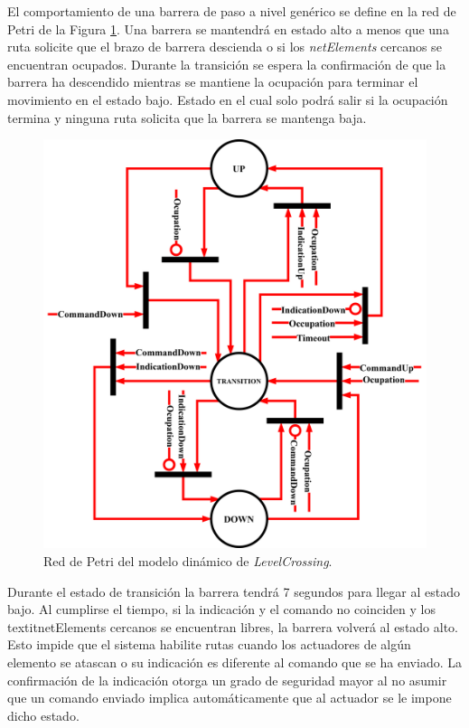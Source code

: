 	El comportamiento de una barrera de paso a nivel genérico se define en la red de Petri de la Figura \ref{fig:LCB_Petri}. Una barrera se mantendrá en estado alto a menos que una ruta solicite que el brazo de barrera descienda o si los \textit{netElements} cercanos se encuentran ocupados. Durante la transición se espera la confirmación de que la barrera ha descendido mientras se mantiene la ocupación para terminar el movimiento en el estado bajo. Estado en el cual solo podrá salir si la ocupación termina y ninguna ruta solicita que la barrera se mantenga baja.
	
	\begin{figure}[H]
		\centering
		\includegraphics[width=1\textwidth]{Figuras/LCB_petri}
		\centering\caption{Red de Petri del modelo dinámico de \textit{LevelCrossing}.}
		\label{fig:LCB_Petri}
	\end{figure}
	
	Durante el estado de transición la barrera tendrá 7 segundos para llegar al estado bajo. Al cumplirse el tiempo, si la indicación y el comando no coinciden y los textit{netElements} cercanos se encuentran libres, la barrera volverá al estado alto. Esto impide que el sistema habilite rutas cuando los actuadores de algún elemento se atascan o su indicación es diferente al comando que se ha enviado. La confirmación de la indicación otorga un grado de seguridad mayor al no asumir que un comando enviado implica automáticamente que al actuador se le impone dicho estado.